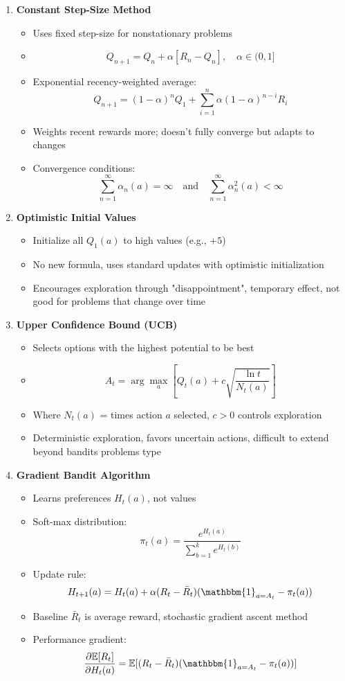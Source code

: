 \begin{enumerate}
\item \textbf{Constant Step-Size Method}
\begin{itemize}
\item Uses fixed step-size for nonstationary problems
\item $$Q_{n+1} = Q_n + \alpha[R_n - Q_n], \quad \alpha \in (0,1]$$
\item Exponential recency-weighted average: 
$$Q_{n+1} = (1-\alpha)^n Q_1 + \sum_{i=1}^{n} \alpha(1-\alpha)^{n-i} R_i$$
\item Weights recent rewards more; doesn't fully converge but adapts to changes
\item Convergence conditions: 
$$\sum_{n=1}^{\infty} \alpha_n(a) = \infty \quad \text{and} \quad \sum_{n=1}^{\infty} \alpha_n^2(a) < \infty$$
\end{itemize}

\item \textbf{Optimistic Initial Values}
\begin{itemize}
\item Initialize all $Q_1(a)$ to high values (e.g., $+5$)
\item No new formula, uses standard updates with optimistic initialization
\item Encourages exploration through "disappointment", temporary effect, not good for problems that change over time
\end{itemize}

\item \textbf{Upper Confidence Bound (UCB)}
\begin{itemize}
\item Selects options with the highest potential to be best
\item $$A_t = \arg\max_a \left[Q_t(a) + c\sqrt{\frac{\ln t}{N_t(a)}}\right]$$
\item Where $N_t(a)$ = times action $a$ selected, $c > 0$ controls exploration
\item Deterministic exploration, favors uncertain actions, difficult to extend beyond bandits problems type
\end{itemize}

\item \textbf{Gradient Bandit Algorithm}
\begin{itemize}
\item Learns preferences $H_t(a)$, not values
\item Soft-max distribution: 
$$\pi_t(a) = \frac{e^{H_t(a)}}{\sum_{b=1}^{k} e^{H_t(b)}}$$
\item Update rule: 
$$H_{t+1}(a) = H_t(a) + \alpha(R_t - \bar{R}_t)(\mathbbm{1}_{a=A_t} - \pi_t(a))$$
\item Baseline $\bar{R}_t$ is average reward, stochastic gradient ascent method
\item Performance gradient: 
$$\frac{\partial \mathbb{E}[R_t]}{\partial H_t(a)} = \mathbb{E}[(R_t - \bar{R}_t)(\mathbbm{1}_{a=A_t} - \pi_t(a))]$$
\end{itemize}


\end{enumerate}
